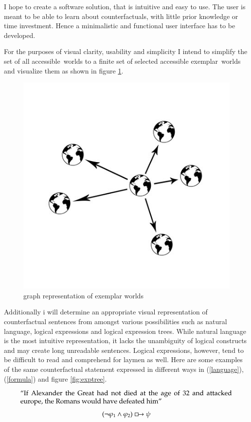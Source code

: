 \documentclass[a4paper,american]{paper}
\begin{document}
I hope to create a software solution, that is intuitive and easy to use. The user is meant to be able to learn about counterfactuals, with little prior knowledge or time investment. Hence a minimalistic and functional user interface has to be developed.

For the purposes of visual clarity, usability and simplicity I intend to simplify the set of all accessible~worlds to a finite set of selected accessible exemplar~worlds and visualize them as shown in figure \ref{fig:closest_worlds}.

\begin{figure}[h]
	\centering
	\includegraphics[scale=0.5]{closest_worlds}
	\caption{graph representation of exemplar worlds}
	\label{fig:closest_worlds}
\end{figure}

Additionally i will determine an appropriate visual representation of counterfactual sentences from amongst various possibilities such as natural language, logical expressions and logical expression trees. While natural language is the most intuitive representation, it lacks the unambiguity of logical constructs and may create long unreadable sentences. Logical expressions, however, tend to be difficult to read and comprehend for laymen as well. Here are some examples of the same counterfactual statement expressed in different ways in (\ref{language}), (\ref{formula}) and figure \ref{fig:exptree}.

\begin{align}
    \text{\parbox{11cm}{``If Alexander~the~Great had not died at the age of 32 and attacked europe, the Romans would have defeated him''}}
     \label{language}
\end{align}
\begin{equation}
	(\neg\varphi_1\wedge\varphi_2)\boxright\psi
	\label{formula}
\end{equation}
\end{document}
